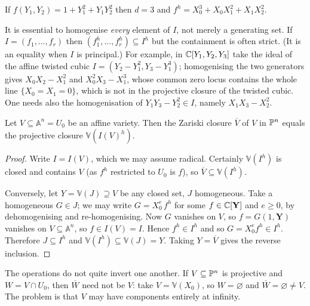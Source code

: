\documentclass[a4paper]{scrartcl}
\newcommand{\A}{\mathbb{A}}
\newcommand{\V}{\mathbb{V}}
\begin{document}
\begin{example}
	If $f(Y_1,Y_2) = 1 + Y_1^2 + Y_1Y_2^2$ then $d = 3$ and $f^h = X_0^3 + X_0X_1^2 + X_1X_2^2$.
\end{example}

\begin{remark}
	It is essential to homogenise \emph{every} element of $I$, not merely a generating set. If $I = (f_1,\dots,f_r)$ then $(f_1^h,\dots,f_r^h) \subseteq I^h$ but the containment is often strict. (It is an equality when $I$ is principal.) For example, in $\mathbb{C}[Y_1,Y_2,Y_3]$ take the ideal of the affine twisted cubic $I = (Y_2 - Y_1^2, Y_3 - Y_1^3)$; homogenising the two generators gives $X_0X_2 - X_1^2$ and $X_0^2X_3 - X_1^3$, whose common zero locus contains the whole line $\{X_0 = X_1 = 0\}$, which is not in the projective closure of the twisted cubic. One needs also the homogenisation of $Y_1Y_3 - Y_2^2 \in I$, namely $X_1X_3 - X_2^2$.
\end{remark}

\begin{proposition}
	Let $V \subseteq \A^n = U_0$ be an affine variety. Then the Zariski closure $\overline V$ of $V$ in $\mathbb{P}^n$ equals the projective closure $\V(I(V)^h)$.
\end{proposition}

\begin{proof}
	Write $I = I(V)$, which we may assume radical. Certainly $\V(I^h)$ is closed and contains $V$ (as $f^h$ restricted to $U_0$ is $f$), so $\overline V \subseteq \V(I^h)$.

	Conversely, let $Y = \V(J) \supseteq V$ be any closed set, $J$ homogeneous. Take a homogeneous $G \in J$; we may write $G = X_0^e\, f^h$ for some $f \in \mathbb{C}[\mathbf Y]$ and $e \geq 0$, by dehomogenising and re-homogenising. Now $G$ vanishes on $V$, so $f = G(1,\mathbf Y)$ vanishes on $V \subseteq \A^n$, so $f \in I(V) = I$. Hence $f^h \in I^h$ and so $G = X_0^e f^h \in I^h$. Therefore $J \subseteq I^h$ and $\V(I^h) \subseteq \V(J) = Y$. Taking $Y = \overline V$ gives the reverse inclusion.
\end{proof}

\begin{remark}
	The operations do not quite invert one another. If $V \subseteq \mathbb{P}^n$ is projective and $W = V \cap U_0$, then $\overline W$ need not be $V$: take $V = \V(X_0)$, so $W = \varnothing$ and $\overline W = \varnothing \neq V$. The problem is that $V$ may have components entirely at infinity.
\end{remark}
\end{document}
